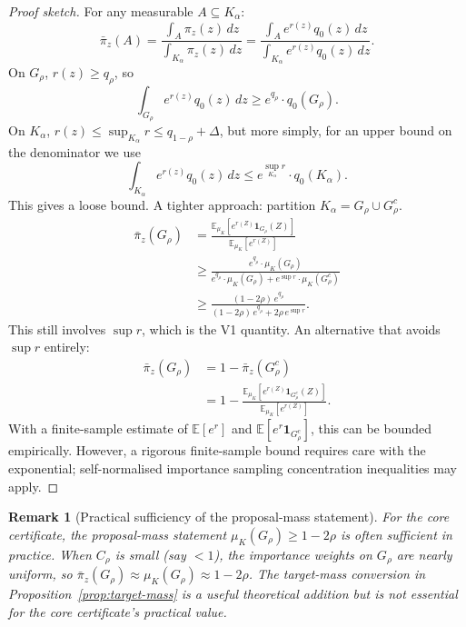 \documentclass[11pt]{article}
\newtheorem{remark}[theorem]{Remark}
\newcommand{\E}{\mathbb{E}}
\begin{document}
\begin{proof}[Proof sketch]
For any measurable $A \subseteq K_\alpha$:
\[
  \bar{\pi}_z(A) = \frac{\int_A \pi_z(z)\,dz}{\int_{K_\alpha} \pi_z(z)\,dz}
  = \frac{\int_A e^{r(z)} q_0(z)\,dz}{\int_{K_\alpha} e^{r(z)} q_0(z)\,dz}.
\]
On $G_\rho$, $r(z) \ge q_\rho$, so
\[
  \int_{G_\rho} e^{r(z)} q_0(z)\,dz \ge e^{q_\rho} \cdot q_0(G_\rho).
\]
On $K_\alpha$, $r(z) \le \sup_{K_\alpha} r \le q_{1-\rho} + \Delta$, but more simply, for an upper bound on the denominator we use
\[
  \int_{K_\alpha} e^{r(z)} q_0(z)\,dz \le e^{\sup_{K_\alpha} r} \cdot q_0(K_\alpha).
\]
This gives a loose bound. A tighter approach: partition $K_\alpha = G_\rho \cup G_\rho^c$.
\begin{align*}
  \bar{\pi}_z(G_\rho) &= \frac{\E_{\mu_K}[e^{r(Z)} \mathbf{1}_{G_\rho}(Z)]}{\E_{\mu_K}[e^{r(Z)}]} \\
  &\ge \frac{e^{q_\rho} \cdot \mu_K(G_\rho)}{e^{q_\rho} \cdot \mu_K(G_\rho) + e^{\sup r} \cdot \mu_K(G_\rho^c)} \\
  &\ge \frac{(1-2\rho) \, e^{q_\rho}}{(1-2\rho) \, e^{q_\rho} + 2\rho \, e^{\sup r}}.
\end{align*}
This still involves $\sup r$, which is the V1 quantity. An alternative that avoids $\sup r$ entirely:
\begin{align}
  \bar{\pi}_z(G_\rho)
  &= 1 - \bar{\pi}_z(G_\rho^c) \nonumber \\
  &= 1 - \frac{\E_{\mu_K}[e^{r(Z)} \mathbf{1}_{G_\rho^c}(Z)]}{\E_{\mu_K}[e^{r(Z)}]}. \label{eq:target-mass-alt}
\end{align}
With a finite-sample estimate of $\E[e^r]$ and $\E[e^r \mathbf{1}_{G_\rho^c}]$, this can be bounded empirically. However, a rigorous finite-sample bound requires care with the exponential; self-normalised importance sampling concentration inequalities may apply.
\end{proof}

\begin{remark}[Practical sufficiency of the proposal-mass statement]
For the core certificate, the proposal-mass statement $\mu_K(G_\rho) \ge 1-2\rho$ is often sufficient in practice. When $C_\rho$ is small (say $< 1$), the importance weights on $G_\rho$ are nearly uniform, so $\bar{\pi}_z(G_\rho) \approx \mu_K(G_\rho) \approx 1-2\rho$. The target-mass conversion in Proposition~\ref{prop:target-mass} is a useful theoretical addition but is not essential for the core certificate's practical value.
\end{remark}
\end{document}

